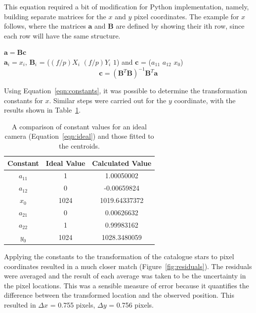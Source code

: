 \documentclass[a4paper,12pt]{article}
\begin{document}
This equation required a bit of modification for Python implementation, namely, building separate matrices for the $x$ and $y$ pixel coordinates. The example for $x$ follows, where the matrices $\mathbf{a}$ and $\mathbf{B}$ are defined by showing their ith row, since each row will have the same structure.

\begin{center}

$\mathbf{a} = \mathbf{B}\mathbf{c}$\\

$\mathbf{a}_{i} = x_{i}$, $\mathbf{B}_{i}$ = ($(f/p)X_{i}$  $(f/p)Y_{i}$   $1$) and $\mathbf{c}$ = ($a_{11}$  $a_{12}$  $x_{0}$)\\

\begin{equation}
\mathbf{c} = (\mathbf{B}^{T}\mathbf{B})^{-1}\mathbf{B}^{T}\mathbf{a}
\label{eqn:constants}
\end{equation}

\end{center}

Using Equation~\ref{eqn:constants}, it was possible to determine the transformation constants for $x$. Similar steps were carried out for the $y$ coordinate, with the results shown in Table~\ref{tab:constants}.

\begin{center}
\begin{table}[!htbp]
  \centering
  \begin{tabular}{c||c||c}
  	Constant & Ideal Value & Calculated Value \\
  	\hline
  	\hline
  	$a_{11}$ & 1 & 1.00050002 \\
  	$a_{12}$ & 0 & -0.00659824 \\
  	$x_{0}$ & 1024 & 1019.64337372 \\
  	$a_{21}$ & 0 & 0.00626632 \\
  	$a_{22}$ & 1 & 0.99983162 \\
  	$y_{0}$ & 1024 & 1028.3480059 \\
   \end{tabular}
    \caption{A comparison of constant values for an ideal camera (Equation~\ref{eqn:ideal}) and those fitted to the centroids.}
    \label{tab:constants}
\end{table}
\end{center}

Applying the constants to the transformation of the catalogue stars to pixel coordinates resulted in a much closer match (Figure~\ref{fig:residuals}). The residuals were averaged and the result of each average was taken to be the uncertainty in the pixel locations. This was a sensible measure of error because it quantifies the difference between the transformed location and the observed position. This resulted in $\Delta x$ = 0.755 pixels, $\Delta y$ = 0.756 pixels.
\end{document}
